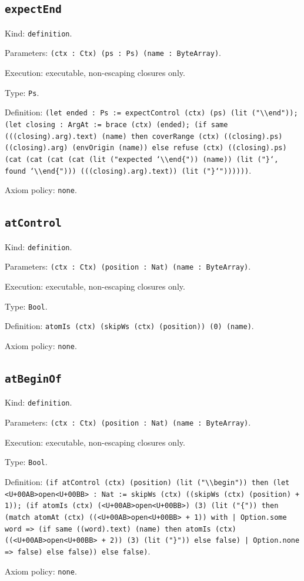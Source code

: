 \documentclass[11pt]{article}
\begin{document}
\subsection*{\texttt{expectEnd}}
\noindent Kind: \texttt{definition}.\par
\noindent Parameters: \texttt{(ctx : Ctx) (ps : Ps) (name : ByteArray)}.\par
\noindent Execution: executable, non-escaping closures only.\par
\noindent Type: \texttt{Ps}.\par
\noindent Definition: \texttt{(let ended : Ps := expectControl (ctx) (ps) (lit ("\textbackslash{}\textbackslash{}end")); (let closing : ArgAt := brace (ctx) (ended); (if same (((closing).arg).text) (name) then coverRange (ctx) ((closing).ps) ((closing).arg) (envOrigin (name)) else refuse (ctx) ((closing).ps) (cat (cat (cat (cat (lit ("expected `\textbackslash{}\textbackslash{}end\{")) (name)) (lit ("\}`, found `\textbackslash{}\textbackslash{}end\{"))) (((closing).arg).text)) (lit ("\}`"))))))}.\par
\noindent Axiom policy: \texttt{none}.\par
\subsection*{\texttt{atControl}}
\noindent Kind: \texttt{definition}.\par
\noindent Parameters: \texttt{(ctx : Ctx) (position : Nat) (name : ByteArray)}.\par
\noindent Execution: executable, non-escaping closures only.\par
\noindent Type: \texttt{Bool}.\par
\noindent Definition: \texttt{atomIs (ctx) (skipWs (ctx) (position)) (0) (name)}.\par
\noindent Axiom policy: \texttt{none}.\par
\subsection*{\texttt{atBeginOf}}
\noindent Kind: \texttt{definition}.\par
\noindent Parameters: \texttt{(ctx : Ctx) (position : Nat) (name : ByteArray)}.\par
\noindent Execution: executable, non-escaping closures only.\par
\noindent Type: \texttt{Bool}.\par
\noindent Definition: \texttt{(if atControl (ctx) (position) (lit ("\textbackslash{}\textbackslash{}begin")) then (let <U+00AB>open<U+00BB> : Nat := skipWs (ctx) ((skipWs (ctx) (position) + 1)); (if atomIs (ctx) (<U+00AB>open<U+00BB>) (3) (lit ("\{")) then (match atomAt (ctx) ((<U+00AB>open<U+00BB> + 1)) with | Option.some word => (if same ((word).text) (name) then atomIs (ctx) ((<U+00AB>open<U+00BB> + 2)) (3) (lit ("\}")) else false) | Option.none => false) else false)) else false)}.\par
\noindent Axiom policy: \texttt{none}.\par
\end{document}

